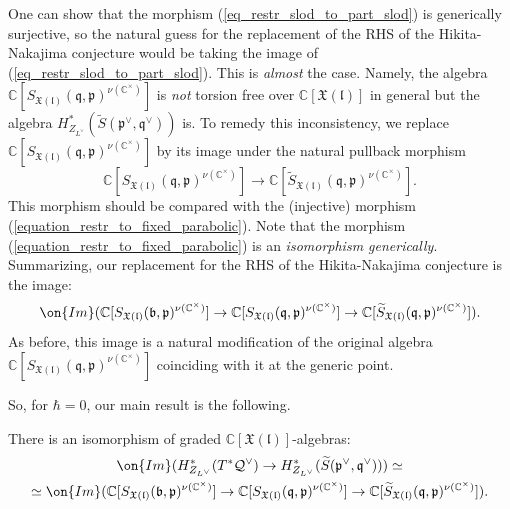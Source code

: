 \documentclass[12pt]{amsart}
\begin{document}
 One can show that the morphism  (\ref{eq_restr_slod_to_part_slod}) is generically surjective, so the natural guess  for the replacement of the RHS of the Hikita-Nakajima conjecture would be taking the image of (\ref{eq_restr_slod_to_part_slod}). This is {\emph{almost}} the case. Namely, the algebra $\mathbb{C}[S_{\mathfrak{X}(\mathfrak{l})}(\mathfrak{q},\mathfrak{p})^{\nu(\mathbb{C}^\times)}]$ is {\emph{not}} torsion free over $\mathbb{C}[\mathfrak{X}(\mathfrak{l})]$ in general but the algebra $H^*_{Z_{L^\vee}}(\widetilde{S}(\mathfrak{p}^\vee,\mathfrak{q}^\vee))$ is. To remedy this inconsistency, we replace $\mathbb{C}[S_{\mathfrak{X}(\mathfrak{l})}(\mathfrak{q},\mathfrak{p})^{\nu(\mathbb{C}^\times)}]$  by its image under the natural pullback morphism 
    \begin{equation}\label{equation_pullback_to_resol}
     \mathbb{C}[S_{\mathfrak{X}(\mathfrak{l})}(\mathfrak{q},\mathfrak{p})^{\nu(\mathbb{C}^\times)}] \rightarrow  \mathbb{C}[\widetilde{S}_{\mathfrak{X}(\mathfrak{l})}(\mathfrak{q},\mathfrak{p})^{\nu(\mathbb{C}^\times)}].
    \end{equation}
    This morphism should be compared with the (injective) morphism (\ref{equation_restr_to_fixed_parabolic}). Note that the morphism (\ref{equation_restr_to_fixed_parabolic}) is an {\emph{isomorphism generically}}. Summarizing, our replacement for the RHS of the Hikita-Nakajima conjecture is the image:
    \begin{equation*}
    \on{Im}( \mathbb{C}[S_{\mathfrak{X}(\mathfrak{l})}(\mathfrak{b},\mathfrak{p})^{\nu(\mathbb{C}^\times)}]  \rightarrow \mathbb{C}[S_{\mathfrak{X}(\mathfrak{l})}(\mathfrak{q},\mathfrak{p})^{\nu(\mathbb{C}^\times)}] \rightarrow  \mathbb{C}[\widetilde{S}_{\mathfrak{X}(\mathfrak{l})}(\mathfrak{q},\mathfrak{p})^{\nu(\mathbb{C}^\times)}]).
    \end{equation*}
    As before, this image is a natural modification of the original algebra $\mathbb{C}[S_{\mathfrak{X}(\mathfrak{l})}(\mathfrak{q},\mathfrak{p})^{\nu(\mathbb{C}^\times)}]$ coinciding with it at the generic point.

    So, for $\hbar=0$, our main result is the following.
    \begin{theorem}\label{intro_thm_classical}
    There is an isomorphism of graded $\mathbb{C}[\mathfrak{X}(\mathfrak{l})]$-algebras:
    \begin{multline*}
        \on{Im}(H^*_{Z_{L^\vee}}(T^*\mathcal{Q}^\vee) 
    \rightarrow H^*_{Z_{L^\vee}}(\widetilde{S}(\mathfrak{p}^\vee,\mathfrak{q}^\vee))) \simeq \\
    \simeq   \on{Im}( \mathbb{C}[S_{\mathfrak{X}(\mathfrak{l})}(\mathfrak{b},\mathfrak{p})^{\nu(\mathbb{C}^\times)}]  \rightarrow \mathbb{C}[S_{\mathfrak{X}(\mathfrak{l})}(\mathfrak{q},\mathfrak{p})^{\nu(\mathbb{C}^\times)}] \rightarrow  \mathbb{C}[\widetilde{S}_{\mathfrak{X}(\mathfrak{l})}(\mathfrak{q},\mathfrak{p})^{\nu(\mathbb{C}^\times)}]).
    \end{multline*}
    \end{theorem}
    
\end{document}
